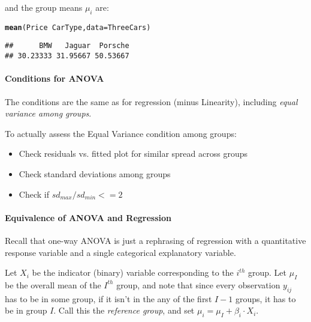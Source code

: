 \documentclass[10pt]{article}\usepackage[]{graphicx}\usepackage[]{color}
\makeatletter
\newcommand{\hlopt}[1]{\textcolor[rgb]{0,0,0}{#1}}%
\newcommand{\hlstd}[1]{\textcolor[rgb]{0.345,0.345,0.345}{#1}}%
\newcommand{\hlkwc}[1]{\textcolor[rgb]{0.333,0.667,0.333}{#1}}%
\newcommand{\hlkwd}[1]{\textcolor[rgb]{0.737,0.353,0.396}{\textbf{#1}}}%
\newenvironment{kframe}{%
 \def\at@end@of@kframe{}%
 \ifinner\ifhmode%
  \def\at@end@of@kframe{\end{minipage}}%
  \begin{minipage}{\columnwidth}%
 \fi\fi%
 \def\FrameCommand##1{\hskip\@totalleftmargin \hskip-\fboxsep
 \colorbox{shadecolor}{##1}\hskip-\fboxsep
     \hskip-\linewidth \hskip-\@totalleftmargin \hskip\columnwidth}%
 \MakeFramed {\advance\hsize-\width
   \@totalleftmargin\z@ \linewidth\hsize
   \@setminipage}}%
 {\par\unskip\endMakeFramed%
 \at@end@of@kframe}
\newenvironment{knitrout}{}{} %
\makeatother
\begin{document}
and the group means $\mu_i$ are:

\begin{knitrout}\footnotesize
{}\color{fgcolor}\begin{kframe}
\begin{alltt}
\hlkwd{mean}\hlstd{(Price} \hlopt{~} \hlstd{CarType,} \hlkwc{data}\hlstd{=ThreeCars)}
\end{alltt}
\begin{verbatim}
##      BMW   Jaguar  Porsche 
## 30.23333 31.95667 50.53667
\end{verbatim}
\end{kframe}
\end{knitrout}

\paragraph{Conditions for ANOVA}

The conditions are the same as for regression (minus Linearity), including \emph{equal variance among groups}. 

    
To actually assess the Equal Variance condition among groups:
		\begin{itemize}
			\item Check residuals vs. fitted plot for similar spread across groups
			\item Check standard deviations among groups
			\item Check if $sd_{max} / sd_{min} <= 2$
		\end{itemize}

\paragraph{Equivalence of ANOVA and Regression}
Recall that one-way ANOVA is just a rephrasing of regression with a quantitative response variable and a single categorical explanatory variable. 

Let $X_i$ be the indicator (binary) variable corresponding to the $i^{th}$ group. Let $\mu_I$ be the overall mean of the $I^{th}$ group, and note that since every observation $y_{ij}$ has to be in some group, if it isn't in the any of the first $I-1$ groups, it has to be in group $I$. Call this the \emph{reference group}, and set $\mu_i = \mu_I + \beta_i \cdot X_i$. 
\end{document}
